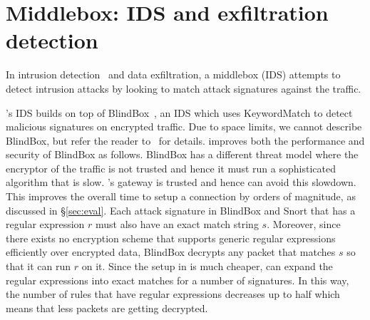 


\section{Middlebox: IDS and exfiltration detection}\label{sec:ids}


In intrusion detection~\cite{Snort} and data exfiltration, a middlebox (IDS) attempts to detect intrusion attacks by looking to match attack signatures against the traffic.


\sys's IDS builds on top of BlindBox~\cite{blindbox}, an IDS which uses  KeywordMatch to detect malicious signatures on encrypted traffic.  Due to space limits, we cannot describe BlindBox, but refer  the reader to~\cite{blindbox} for details.  \sys improves both the performance and security of BlindBox as follows. BlindBox has a different threat model where the encryptor of the traffic is not trusted and hence it must run a sophisticated algorithm that is slow. \sys's gateway is trusted and hence \sys can avoid this slowdown. This improves the overall time to setup a connection by orders of magnitude, as discussed in \S\ref{sec:eval}. 
%
Each attack signature in BlindBox and Snort that has a regular expression $r$ must also have an exact match string $s$. Moreover, since there exists no encryption scheme that supports generic regular expressions efficiently over encrypted data, BlindBox decrypts any packet that matches $s$ so that it can run  $r$  on it. Since the setup in \sys is much cheaper,  \sys can expand the regular expressions into exact matches for a number of signatures. In this way, the number of rules that have regular expressions decreases up to half which means that less packets are getting decrypted.


